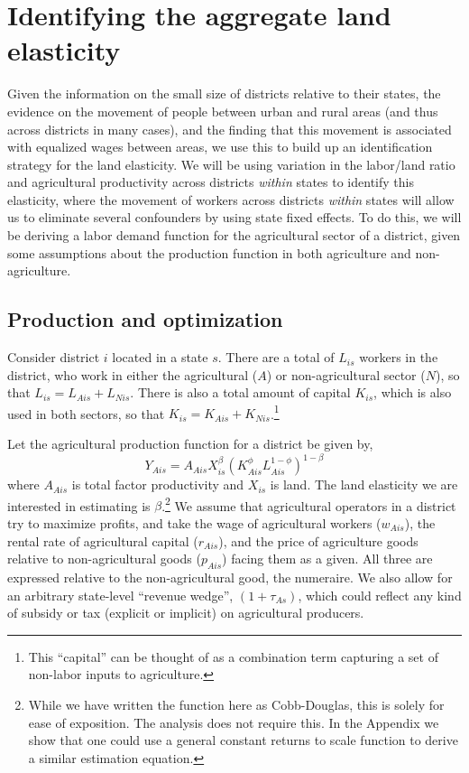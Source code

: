 \documentclass[11pt]{article}
\begin{document}
\section{Identifying the aggregate land elasticity}\label{SEC_agmodel}
Given the information on the small size of districts relative to their states, the evidence on the movement of people between urban and rural areas (and thus across districts in many cases), and the finding that this movement is associated with equalized wages between areas, we use this to build up an identification strategy for the land elasticity. We will be using variation in the labor/land ratio and agricultural productivity across districts \textit{within} states to identify this elasticity, where the movement of workers across districts \textit{within} states will allow us to eliminate several confounders by using state fixed effects. To do this, we will be deriving a labor demand function for the agricultural sector of a district, given some assumptions about the production function in both agriculture and non-agriculture.

\subsection{Production and optimization}
Consider district $i$ located in a state $s$. There are a total of $L_{is}$ workers in the district, who work in either the agricultural ($A$) or non-agricultural sector ($N$), so that $L_{is} = L_{Ais} + L_{Nis}$. There is also a total amount of capital $K_{is}$, which is also used in both sectors, so that $K_{is} = K_{Ais} + K_{Nis}$.\footnote{This ``capital'' can be thought of as a combination term capturing a set of non-labor inputs to agriculture.}

Let the agricultural production function for a district be given by,
\begin{equation}
Y_{Ais} = A_{Ais} X_{is}^{\beta} \left(K_{Ais}^{\phi}L_{Ais}^{1-\phi}\right)^{1-\beta} \label{EQ_production}
\end{equation}
where $A_{Ais}$ is total factor productivity and $X_{is}$ is land. The land elasticity we are interested in estimating is $\beta$.\footnote{While we have written the function here as Cobb-Douglas, this is solely for ease of exposition. The analysis does not require this. In the Appendix we show that one could use a general constant returns to scale function to derive a similar estimation equation.} We assume that agricultural operators in a district try to maximize profits, and take the wage of agricultural workers ($w_{Ais}$), the rental rate of agricultural capital ($r_{Ais}$), and the price of agriculture goods relative to non-agricultural goods ($p_{Ais}$) facing them as a given. All three are expressed relative to the non-agricultural good, the numeraire. We also allow for an arbitrary state-level ``revenue wedge'', $(1+\tau_{As})$, which could reflect any kind of subsidy or tax (explicit or implicit) on agricultural producers. 
\end{document}
